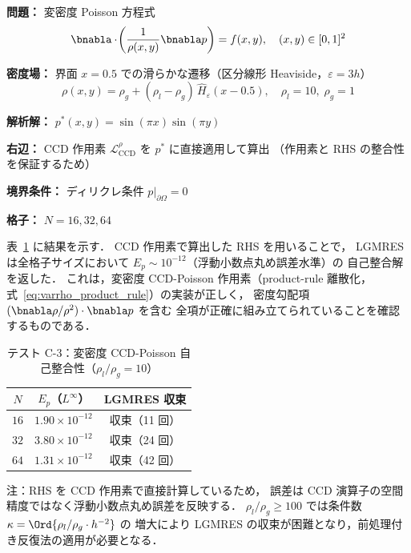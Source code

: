 \begin{tcolorbox}[algbox, title={テスト C-3 の設定}]
\textbf{問題：} 変密度 Poisson 方程式
\[
  \bnabla\cdot\!\left(\frac{1}{\rho(x,y)}\bnabla p\right) = f(x,y),
  \quad (x,y) \in [0,1]^2
\]

\textbf{密度場：} 界面 $x = 0.5$ での滑らかな遷移（区分線形 Heaviside，$\varepsilon = 3h$）
\[
  \rho(x,y) = \rho_g + (\rho_l - \rho_g)\,\hat{H}_\varepsilon(x - 0.5),
  \quad \rho_l = 10,\; \rho_g = 1
\]

\textbf{解析解：} $p^*(x,y) = \sin(\pi x)\sin(\pi y)$

\textbf{右辺：} CCD 作用素 $\mathcal{L}_{\mathrm{CCD}}^{\rho}$ を $p^*$ に直接適用して算出
（作用素と RHS の整合性を保証するため）

\textbf{境界条件：} ディリクレ条件 $p|_{\partial\Omega} = 0$

\textbf{格子：} $N = 16, 32, 64$
\end{tcolorbox}

表~\ref{tab:ccd_test_c3} に結果を示す．
CCD 作用素で算出した RHS を用いることで，
LGMRES は全格子サイズにおいて $E_p \sim 10^{-12}$（浮動小数点丸め誤差水準）の
自己整合解を返した．
これは，変密度 CCD-Poisson 作用素（product-rule 離散化，
式~\eqref{eq:varrho_product_rule}）の実装が正しく，
密度勾配項 $(\bnabla\rho/\rho^2)\cdot\bnabla p$ を含む
全項が正確に組み立てられていることを確認するものである．

\begin{table}[htbp]
\centering
\caption{テスト C-3：変密度 CCD-Poisson 自己整合性（$\rho_l/\rho_g = 10$）}
\label{tab:ccd_test_c3}
\begin{tabular}{ccc}
\toprule
$N$ & $E_p$（$L^\infty$） & LGMRES 収束 \\
\midrule
$16$  & $1.90 \times 10^{-12}$ & 収束（11 回） \\
$32$  & $3.80 \times 10^{-12}$ & 収束（24 回） \\
$64$  & $1.31 \times 10^{-12}$ & 収束（42 回） \\
\bottomrule
\end{tabular}

\medskip
注：RHS を CCD 作用素で直接計算しているため，
誤差は CCD 演算子の空間精度ではなく浮動小数点丸め誤差を反映する．
$\rho_l/\rho_g \geq 100$ では条件数 $\kappa = \Ord{\rho_l/\rho_g \cdot h^{-2}}$ の
増大により LGMRES の収束が困難となり，前処理付き反復法の適用が必要となる．
\end{table}

